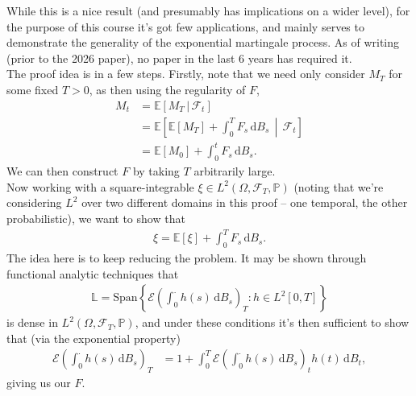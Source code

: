 \documentclass{tikzposter} %
\newcommand{\diff}{\mathrm{d}}
\newcommand\E[1]{\mathbb{E}\left[ #1 \right]}
\newcommand{\mc}{\mathcal}
\begin{document}
\begin{columns}
{    While this is a nice result (and presumably has implications on a wider level), for the purpose of this course it's got few applications, and mainly serves to demonstrate the generality of the exponential martingale process. As of writing (prior to the 2026 paper), no paper in the last 6 years has required it. \\

    The proof idea is in a few steps. Firstly, note that we need only consider $M_T$ for some fixed $T > 0$, as then using the regularity of $F$,
    \begin{align*}
      M_t &= \E{M_T \,|\, \mc{F}_t} \\
          &= \E{\E{M_T} + \int_0^T F_s \,\mathrm{d}B_s \,\middle|\, \mc{F}_t} \\
      &= \E{M_0} + \int_0^t F_s \,\mathrm{d}B_s.
    \end{align*}
    We can then construct $F$ by taking $T$ arbitrarily large. \\

    Now working with a square-integrable $\xi \in L^2(\Omega, \mc{F}_T, \mathbb{P})$ (noting that we're considering $L^2$ over two different domains in this proof -- one temporal, the other probabilistic), we want to show that
    \begin{align*}
      \xi = \E{\xi} + \int_0^T F_s \, \diff B_s.
    \end{align*}
    The idea here is to keep reducing the problem. It may be shown through functional analytic techniques that
    \begin{align*}
      \mathbb{L} = \mathrm{Span} \left\{\mc{E}\left(\int_0^{\cdot} h(s) \,\mathrm{d}B_s\right)_T : h \in L^2[0,T]\right\}
    \end{align*}
    is dense in $L^2(\Omega, \mc{F}_T, \mathbb{P})$, and under these conditions it's then sufficient to show that (via the exponential property)
    \begin{align*}
      \mc{E}\left(\int_0^{\cdot} h(s) \, \diff B_s\right)_T &= 1 + \int_0^T \mc{E}\left(\int_0^{\cdot} h(s) \, \diff B_s\right)_t h(t) \, \diff B_t,
    \end{align*}
    giving us our $F$. \\

}
\end{columns}
\end{document}
